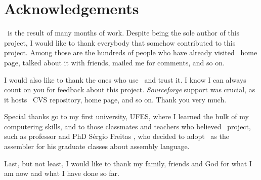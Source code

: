 \chapter*{Acknowledgements}
\popasm\ is the result of many months of work. Despite being the
sole author of this project, I would like to
thank everybody that somehow contributed to this project. Among those
are the hundreds of people who have already
visited \popasm\ home page, talked about it with friends, mailed
me for comments, and so on.

I would also like to thank the ones who use \popasm\ and trust it.
I know I can always count on you for
feedback about this project. \emph{Sourceforge} support was crucial, as
it hosts \popasm\ CVS repository,
home page, and so on. Thank you very much.

Special thanks go to my first university, UFES\cite{UFES}, where
I learned the bulk of my computering skills, and
to those classmates and teachers who believed \popasm\ project,
such as professor and PhD S\'ergio Freitas%
\cite{FREITAS}, who decided to adopt \popasm\ as the assembler for
his graduate classes about assembly language.

Last, but not least, I would like to thank my family, friends and God
for what I am now and what I have done so far.

